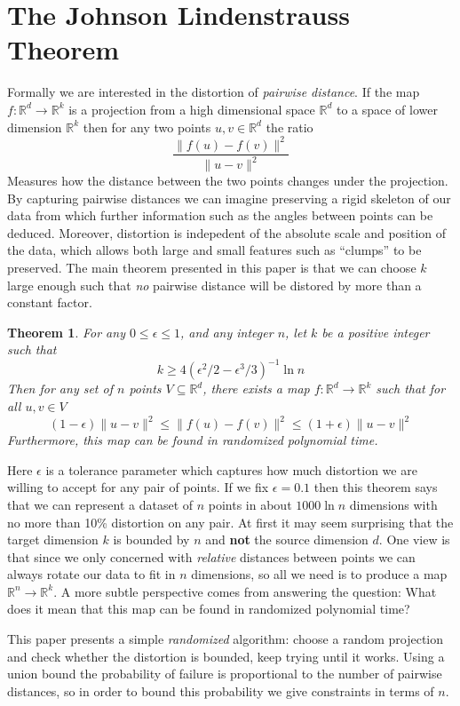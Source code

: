 \documentclass[11pt]{article}
\newcommand{\arr}{\rightarrow}
\newcommand{\R}{\mathbb{R}}
\newtheorem{Thm}{Theorem}
\begin{document}
\section{The Johnson Lindenstrauss Theorem}
Formally we are interested in the distortion of \textit{pairwise distance}. If the map $f : \R^d \arr \R^k$ is a projection from a high dimensional space $\R^d$ to a space of lower dimension $\R^k$ then for any two points $u, v \in \R^d$ the ratio
\[ \frac{\| f(u) - f(v) \|^2}{\| u - v \|^2} \]
Measures how the distance between the two points changes under the projection. By capturing pairwise distances we can imagine preserving a rigid skeleton of our data from which further information such as the angles between points can be deduced. Moreover, distortion is indepedent of the absolute scale and position of the data, which allows both large and small features such as ``clumps'' to be preserved. The main theorem presented in this paper \cite{mainpaper} is that we can choose $k$ large enough such that \textit{no} pairwise distance will be distored by more than a constant factor.

\begin{Thm}
  For any $0 \leq \epsilon \leq 1$, and any integer $n$, let $k$ be a positive
  integer such that
  \[ 
    k \geq 4(\epsilon^2/2 - \epsilon^3/3)^{-1} \ln n 
  \]
  Then for any set of $n$ points $V \subseteq \R^d$, there exists a map
  $f:\R^d \arr \R^k$ such that for all $u, v \in V$
  \[
    (1-\epsilon)\|u - v\|^2 \leq \| f(u) - f(v) \|^2 \leq (1+\epsilon) \| u - v \|^2 
  \]
  Furthermore, this map can be found in randomized polynomial time.
\end{Thm}

Here $\epsilon$ is a tolerance parameter which captures how much distortion we are willing to accept for any pair of points. If we fix $\epsilon = 0.1$ then this theorem says that we can represent a dataset of $n$ points in about $1000 \ln n$ dimensions with no more than 10\% distortion on any pair. At first it may seem surprising that the target dimension $k$ is bounded by $n$ and \textbf{not} the source dimension $d$. One view is that since we only concerned with \textit{relative} distances between points we can always rotate our data to fit in $n$ dimensions, so all we need is to produce a map $\R^n \arr \R^k$. A more subtle perspective comes from answering the question: What does it mean that this map can be found in randomized polynomial time?

This paper presents a simple \textit{randomized} algorithm: choose a random projection and check whether the distortion is bounded, keep trying until it works. Using a union bound the probability of failure is proportional to the number of pairwise distances, so in order to bound this probability we give constraints in terms of $n$.
\end{document}
